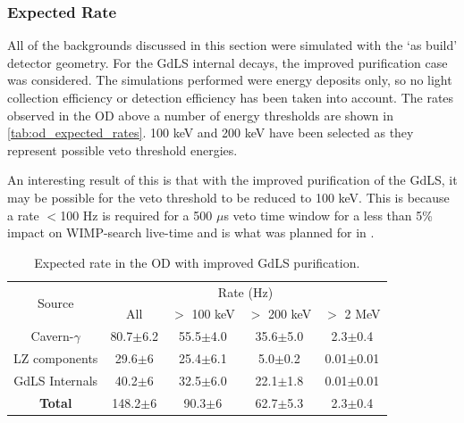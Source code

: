 \subsubsection{Expected Rate}
\par
All of the backgrounds discussed in this section were simulated with the `as build' detector geometry.
For the GdLS internal decays, the improved purification case was considered.
The simulations performed were energy deposits only, so no light collection efficiency or detection efficiency has been taken into account.
The rates observed in the OD above a number of energy thresholds are shown in \autoref{tab:od_expected_rates}.
100 keV and 200 keV have been selected as they represent possible veto threshold energies.


\par
An interesting result of this is that with the improved purification of the GdLS, it may be possible for the veto threshold to be reduced to 100 keV.
This is because a rate $<$100 Hz is required for a 500 $\mu$s veto time window for a less than 5\% impact on WIMP-search live-time and is what was planned for in \cite{LZ_TechnicalDesignReview_ref}.

\begin{table}[]
    \centering
    \begin{tabular}{c|c|c|c|c} %
    \hline
    \multirow{2}{*}{Source} & \multicolumn{4}{c}{Rate (Hz)} \\
                            & All          & $>$ 100 keV   & $>$ 200 keV   & $>$ 2 MeV \\ \hline
    Cavern-$\gamma$         & 80.7$\pm$6.2 & 55.5$\pm$4.0  & 35.6$\pm$5.0  & 2.3$\pm$0.4     \\
    LZ components           & 29.6$\pm$6   & 25.4$\pm$6.1  & 5.0$\pm$0.2   & 0.01$\pm$0.01   \\
    GdLS Internals          & 40.2$\pm$6   & 32.5$\pm$6.0  & 22.1$\pm$1.8  & 0.01$\pm$0.01   \\ \hline
    \textbf{Total}          & 148.2$\pm$6  & 90.3$\pm$6    & 62.7$\pm$5.3  & 2.3$\pm$0.4      \\ \hline
    \end{tabular}
    \caption{Expected rate in the OD with improved GdLS purification.}
    \label{tab:od_expected_rates}
\end{table} 




